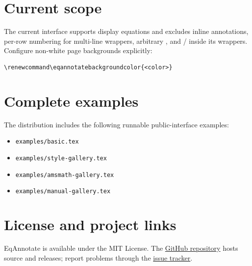\documentclass[11pt]{article}
\newcommand{\cmd}[1]{\texttt{\string#1}}
\begin{document}
\section{Current scope}
The current interface supports display equations and excludes inline
annotations, per-row numbering for multi-line wrappers, arbitrary \cmd{\tag},
and \cmd{\intertext}/\cmd{\shortintertext} inside its wrappers. Configure
non-white page backgrounds explicitly:
\begin{verbatim}
\renewcommand\eqannotatebackgroundcolor{<color>}
\end{verbatim}

\section{Complete examples}
The distribution includes the following runnable public-interface examples:
\begin{itemize}
\item \texttt{examples/basic.tex}
\item \texttt{examples/style-gallery.tex}
\item \texttt{examples/amsmath-gallery.tex}
\item \texttt{examples/manual-gallery.tex}
\end{itemize}

\section{License and project links}
EqAnnotate is available under the MIT License. The
\href{https://github.com/intelland/eqannotate}{GitHub repository} hosts source
and releases; report problems through the
\href{https://github.com/intelland/eqannotate/issues}{issue tracker}.
\end{document}
